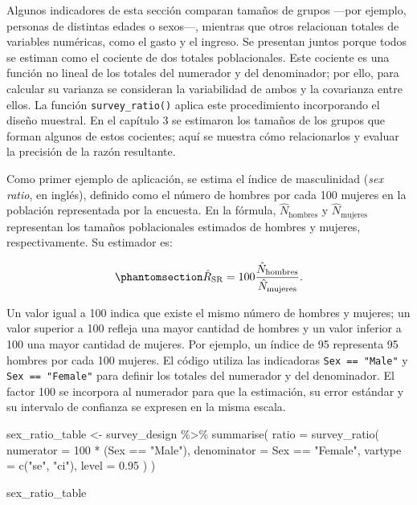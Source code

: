 \documentclass[
  spanish,
  11pt,
  letterpaper,
  oneside,
  open=any]{scrbook}
\newenvironment{Shaded}{\begin{snugshade}}{\end{snugshade}}
\newcommand{\AttributeTok}[1]{\textcolor[rgb]{0.40,0.45,0.13}{#1}}
\newcommand{\DecValTok}[1]{\textcolor[rgb]{0.68,0.00,0.00}{#1}}
\newcommand{\FloatTok}[1]{\textcolor[rgb]{0.68,0.00,0.00}{#1}}
\newcommand{\FunctionTok}[1]{\textcolor[rgb]{0.28,0.35,0.67}{#1}}
\newcommand{\NormalTok}[1]{\textcolor[rgb]{0.00,0.23,0.31}{#1}}
\newcommand{\OtherTok}[1]{\textcolor[rgb]{0.00,0.23,0.31}{#1}}
\newcommand{\SpecialCharTok}[1]{\textcolor[rgb]{0.37,0.37,0.37}{#1}}
\newcommand{\StringTok}[1]{\textcolor[rgb]{0.13,0.47,0.30}{#1}}
\begin{document}
Algunos indicadores de esta sección comparan tamaños de grupos ---por
ejemplo, personas de distintas edades o sexos---, mientras que otros
relacionan totales de variables numéricas, como el gasto y el ingreso.
Se presentan juntos porque todos se estiman como el cociente de dos
totales poblacionales. Este cociente es una función no lineal de los
totales del numerador y del denominador; por ello, para calcular su
varianza se consideran la variabilidad de ambos y la covarianza entre
ellos. La función \texttt{survey\_ratio()} aplica este procedimiento
incorporando el diseño muestral. En el capítulo 3 se estimaron los
tamaños de los grupos que forman algunos de estos cocientes; aquí se
muestra cómo relacionarlos y evaluar la precisión de la razón
resultante.

Como primer ejemplo de aplicación, se estima el índice de masculinidad
(\emph{sex ratio}, en inglés), definido como el número de hombres por
cada 100 mujeres en la población representada por la encuesta. En la
fórmula, \(\hat N_{\mathrm{hombres}}\) y \(\hat N_{\mathrm{mujeres}}\)
representan los tamaños poblacionales estimados de hombres y mujeres,
respectivamente. Su estimador es:

\begin{equation}\protect\phantomsection\label{eq-indice-masculinidad}{
\hat R_{\mathrm{SR}}
=
100\frac{\hat N_{\mathrm{hombres}}}{\hat N_{\mathrm{mujeres}}}.
}\end{equation}

Un valor igual a 100 indica que existe el mismo número de hombres y
mujeres; un valor superior a 100 refleja una mayor cantidad de hombres y
un valor inferior a 100 una mayor cantidad de mujeres. Por ejemplo, un
índice de 95 representa 95 hombres por cada 100 mujeres. El código
utiliza las indicadoras \texttt{Sex\ ==\ "Male"} y
\texttt{Sex\ ==\ "Female"} para definir los totales del numerador y del
denominador. El factor 100 se incorpora al numerador para que la
estimación, su error estándar y su intervalo de confianza se expresen en
la misma escala.

\begin{Shaded}
\begin{Highlighting}[]
\NormalTok{sex\_ratio\_table }\OtherTok{\textless{}{-}}\NormalTok{ survey\_design }\SpecialCharTok{\%\textgreater{}\%}
  \FunctionTok{summarise}\NormalTok{(}
    \AttributeTok{ratio =} \FunctionTok{survey\_ratio}\NormalTok{(}
      \AttributeTok{numerator =} \DecValTok{100} \SpecialCharTok{*}\NormalTok{ (Sex }\SpecialCharTok{==} \StringTok{"Male"}\NormalTok{),}
      \AttributeTok{denominator =}\NormalTok{ Sex }\SpecialCharTok{==} \StringTok{"Female"}\NormalTok{,}
      \AttributeTok{vartype =} \FunctionTok{c}\NormalTok{(}\StringTok{"se"}\NormalTok{, }\StringTok{"ci"}\NormalTok{),}
      \AttributeTok{level =} \FloatTok{0.95}
\NormalTok{    )}
\NormalTok{  )}

\NormalTok{sex\_ratio\_table}
\end{Highlighting}
\end{Shaded}
\end{document}
